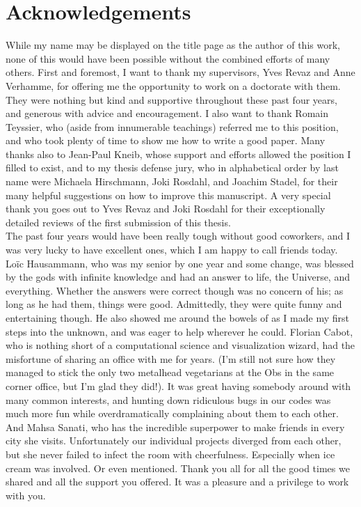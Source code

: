 \chapter*{Acknowledgements}


While my name may be displayed on the title page as the author of this work, none of this would have
been possible without the combined efforts of many others. First and foremost, I want to thank my
supervisors, Yves Revaz and Anne Verhamme, for offering me the opportunity to work on a doctorate
with them. They were nothing but kind and supportive throughout these past four years, and generous
with advice and encouragement. I also want to thank Romain Teyssier, who (aside from innumerable
teachings) referred me to this position, and who took plenty of time to show me how to write a good
paper. Many thanks also to Jean-Paul Kneib, whose support and efforts allowed the position I filled
to exist, and to my thesis defense jury, who in alphabetical order by last name were Michaela
Hirschmann, Joki Rosdahl, and Joachim Stadel, for their many helpful suggestions on how to improve
this manuscript. A very special thank you goes out to Yves Revaz and Joki Rosdahl for their
exceptionally detailed reviews of the first submission of this thesis. \\


The past four years would have been really tough without good coworkers, and I was very lucky to
have excellent ones, which I am happy to call friends today. Lo\"ic Hausammann, who was my senior
by one year and some change, was blessed by the gods with infinite knowledge and had an answer to
life, the Universe, and everything. Whether the answers were correct though was no concern of his;
as long as he had them, things were good. Admittedly, they were quite funny and entertaining though.
He also showed me around the bowels of \swift as I made my first steps into the unknown, and was
eager to help wherever he could. Florian Cabot, who is nothing short of a computational science and
visualization wizard, had the misfortune of sharing an office with me for years. (I'm still not sure
how they managed to stick the only two metalhead vegetarians at the Obs in the same corner office,
but I'm glad they did!). It was great having somebody around with many common interests, and hunting
down ridiculous bugs in our codes was much more fun while overdramatically complaining about them to
each other. And Mahsa Sanati, who has the incredible superpower to make friends in every city she
visits. Unfortunately our individual projects diverged from each other, but she never failed to
infect the room with cheerfulness. Especially when ice cream was involved. Or even mentioned. Thank
you all for all the good times we shared and all the support you offered. It was a pleasure and a
privilege to work with you. \\

